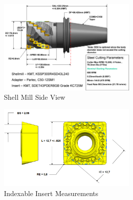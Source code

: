\documentclass{mtconnect}	%
\begin{document}
\begin{figure}[ht]
  \centering
  \includegraphics[width=0.6\textwidth]{figures/a7-shell-mill-side-view.png}
  \caption{Shell Mill Side View}
  \label{fig:a7-shell-mill-side-view}
\end{figure}
\FloatBarrier

\begin{figure}[ht]
  \centering
  \includegraphics[width=0.6\textwidth]{figures/a8-indexable-insert-measurements.png}
  \caption{Indexable Insert Measurements}
  \label{fig:a8-indexable-insert-measurements}
\end{figure}
\FloatBarrier
\end{document}
